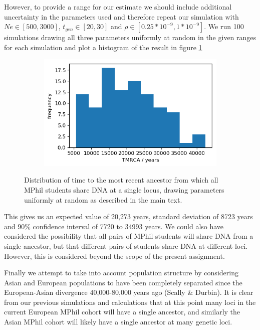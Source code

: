 \documentclass{article}
\begin{document}
However, to provide a range for our estimate we should include additional uncertainty in the parameters used and therefore repeat our simulation with $Ne \in [500, 3000]$, $t_{gen} \in [20, 30]$ and $\rho \in [0.25*10^{-9}, 1*10^{-9}]$. We run 100 simulations drawing all three parameters uniformly at random in the given ranges for each simulation and plot a histogram of the result in figure \ref{fig:randparams}
\begin{figure}[h]
	\centering
	\begin{subfigure}[t]{0.45\linewidth}
		\centering
		\includegraphics[width = 1.0\linewidth, trim={0 0 0 0}, clip=true]{figures/variableparams_allcoal2.png}
	\end{subfigure}
\caption{Distribution of time to the most recent ancestor from which all MPhil students share DNA at a single locus, drawing parameters uniformly at random as described in the main text.}
\label{fig:randparams}
\end{figure}

This gives us an expected value of 20,273 years, standard deviation of 8723 years and 90\% confidence interval of 7720 to 34993 years. We could also have considered the possibility that all pairs of MPhil students will share DNA from a single ancestor, but that different pairs of students share DNA at different loci. However, this is considered beyond the scope of the present assignment.

Finally we attempt to take into account population structure by considering Asian and European populations to have been completely separated since the European-Asian divergence 40,000-80,000 years ago (Scally \& Durbin).
It is clear from our previous simulations and calculations that at this point many loci in the current European MPhil cohort will have a single ancestor, and similarly the Asian MPhil cohort will likely have a single ancestor at many genetic loci.
\end{document}
